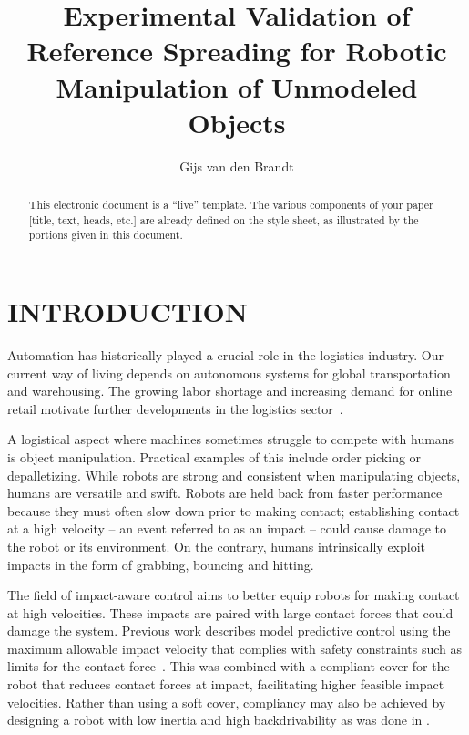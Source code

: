 \documentclass[a4paper, 10pt, conference]{ieeeconf}
\title{\LARGE \bf
    Experimental Validation of Reference Spreading for Robotic Manipulation of Unmodeled Objects
    }
\author{Gijs van den Brandt%
    }
\begin{document}
    \maketitle
    \thispagestyle{empty}
    \pagestyle{empty}

    \begin{abstract}

    This electronic document is a ``live'' template. The various components of your paper [title, text, heads, etc.] are already defined on the style sheet, as illustrated by the portions given in this document.

    \end{abstract}

    \section{INTRODUCTION}

    Automation has historically played a crucial role in the logistics industry. Our current way of living depends on autonomous systems for global transportation and warehousing. The growing labor shortage and increasing demand for online retail motivate further developments in the logistics sector~\cite{dekhneAutomationLogisticsBig2019}.

    A logistical aspect where machines sometimes struggle to compete with humans is object manipulation. Practical examples of this include order picking or depalletizing. While robots are strong and consistent when manipulating objects, humans are versatile and swift. Robots are held back from faster performance because they must often slow down prior to making contact; establishing contact at a high velocity -- an event referred to as an impact -- could cause damage to the robot or its environment. On the contrary, humans intrinsically exploit impacts in the form of grabbing, bouncing and hitting.

    The field of impact-aware control aims to better equip robots for making contact at high velocities. These impacts are paired with large contact forces that could damage the system. Previous work describes model predictive control using the maximum allowable impact velocity that complies with safety constraints such as limits for the contact force~\cite{dehioRobotSafeImpactsSoft2021, dehioDualArmBoxGrabbing2022}. This was combined with a compliant cover for the robot that reduces contact forces at impact, facilitating higher feasible impact velocities. Rather than using a soft cover, compliancy may also be achieved by designing a robot with low inertia and high backdrivability as was done in \cite{songDevelopmentLowInertiaHighStiffness2018}.
\end{document}

